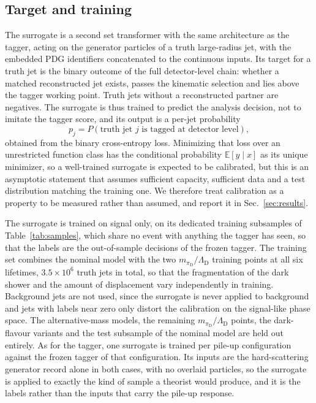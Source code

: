 \documentclass[a4paper,11pt]{article}
\newcommand{\pid}{\pi_{\mathrm{D}}}
\newcommand{\mpid}{m_{\pid}}
\begin{document}
\subsection{Target and training}

The surrogate is a second set transformer with the same architecture
as the tagger, acting on the generator particles of a truth
large-radius jet, with the embedded PDG identifiers concatenated to the
continuous inputs. Its target for a truth jet is the binary outcome of
the full detector-level chain: whether a matched reconstructed jet
exists, passes the kinematic selection and lies above the tagger
working point. Truth jets without a reconstructed partner are
negatives. The surrogate is thus trained to predict the analysis
decision, not to imitate the tagger score, and its output is a
per-jet probability
\begin{equation}
  p_j = P(\text{truth jet } j \text{ is tagged at detector level}),
\end{equation}
obtained from the binary cross-entropy loss. Minimizing that loss over
an unrestricted function class has the conditional probability
$\mathbb{E}[y \mid x]$ as its unique minimizer, so a well-trained
surrogate is expected to be calibrated, but this is an asymptotic
statement that assumes sufficient capacity, sufficient data and a test
distribution matching the training one. We therefore treat calibration
as a property to be measured rather than assumed, and report it in
Sec.~\ref{sec:results}.

The surrogate is trained on signal only, on its dedicated training
subsamples of Table~\ref{tab:samples}, which share no event with
anything the tagger has seen, so that the labels are the out-of-sample
decisions of the frozen tagger. The training set combines the nominal model with
the two $\mpid/\Lambda_{\mathrm{D}}$ training points at all six
lifetimes, $3.5\times10^{6}$ truth jets in total, so that the
fragmentation of the dark shower and the amount of displacement vary
independently in training. Background jets are not used, since the
surrogate is never applied to background and jets with labels near
zero only distort the calibration on the signal-like phase space. The
alternative-mass models, the remaining
$\mpid/\Lambda_{\mathrm{D}}$ points, the dark-flavour variants and
the test subsample of the nominal model are held out entirely. As for
the tagger, one surrogate is trained per pile-up configuration against
the frozen tagger of that configuration. Its inputs are the
hard-scattering generator record alone in both cases, with no overlaid
particles, so the surrogate is applied to exactly the kind of sample a
theorist would produce, and it is the labels rather than the inputs
that carry the pile-up response.
\end{document}
